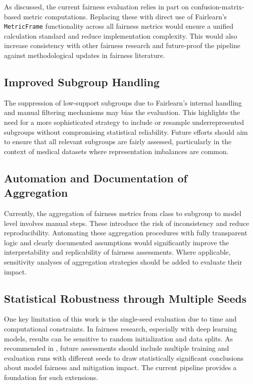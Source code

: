 \documentclass[12pt, a4paper, oneside]{book}   	%
\begin{document}
	As discussed, the current fairness evaluation relies in part on confusion-matrix-based metric computations. Replacing these with direct use of Fairlearn’s \texttt{MetricFrame} functionality across all fairness metrics would ensure a unified calculation standard and reduce implementation complexity. This would also increase consistency with other fairness research and future-proof the pipeline against methodological updates in fairness literature.
	
	\subsection{Improved Subgroup Handling}
	
	The suppression of low-support subgroups due to Fairlearn’s internal handling and manual filtering mechanisms may bias the evaluation. This highlights the need for a more sophisticated strategy to include or resample underrepresented subgroups without compromising statistical reliability. Future efforts should aim to ensure that all relevant subgroups are fairly assessed, particularly in the context of medical datasets where representation imbalances are common.
	
	\subsection{Automation and Documentation of Aggregation}
	
	Currently, the aggregation of fairness metrics from class to subgroup to model level involves manual steps. These introduce the risk of inconsistency and reduce reproducibility. Automating these aggregation procedures with fully transparent logic and clearly documented assumptions would significantly improve the interpretability and replicability of fairness assessments. Where applicable, sensitivity analyses of aggregation strategies should be added to evaluate their impact.
	
	\subsection{Statistical Robustness through Multiple Seeds}
	
	One key limitation of this work is the single-seed evaluation due to time and computational constraints. In fairness research, especially with deep learning models, results can be sensitive to random initialization and data splits. As recommended in \textcite{Valentim_2019}, future assessments should include multiple training and evaluation runs with different seeds to draw statistically significant conclusions about model fairness and mitigation impact. The current pipeline provides a foundation for such extensions.
	
\end{document}
